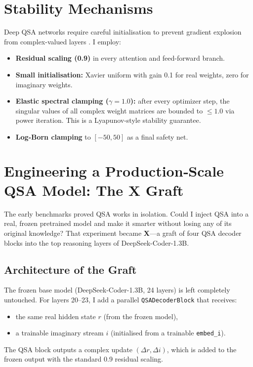 \documentclass[11pt]{article}
\begin{document}
\section{Stability Mechanisms}

Deep QSA networks require careful initialisation to prevent gradient explosion from complex-valued layers \cite{phasor2026}. I employ:

\begin{itemize}
    \item \textbf{Residual scaling (0.9)} in every attention and feed-forward branch.
    \item \textbf{Small initialisation:} Xavier uniform with gain 0.1 for real weights, zero for imaginary weights.
    \item \textbf{Elastic spectral clamping (\(\gamma = 1.0\)):} after every optimizer step, the singular values of all complex weight matrices are bounded to \(\le 1.0\) via power iteration. This is a Lyapunov-style stability guarantee.
    \item \textbf{Log‑Born clamping} to \([-50, 50]\) as a final safety net.
\end{itemize}

\section{Engineering a Production‑Scale QSA Model: The X Graft}

The early benchmarks proved QSA works in isolation. Could I inject QSA into a real, frozen pretrained model and make it smarter without losing any of its original knowledge? That experiment became \textbf{X}---a graft of four QSA decoder blocks into the top reasoning layers of DeepSeek-Coder-1.3B.

\subsection{Architecture of the Graft}

The frozen base model (DeepSeek-Coder-1.3B, 24 layers) is left completely untouched. For layers 20--23, I add a parallel \texttt{QSADecoderBlock} that receives:
\begin{itemize}
    \item the same real hidden state \(r\) (from the frozen model),
    \item a trainable imaginary stream \(i\) (initialised from a trainable \texttt{embed\_i}).
\end{itemize}
The QSA block outputs a complex update \((\Delta r, \Delta i)\), which is added to the frozen output with the standard 0.9 residual scaling.
\end{document}

